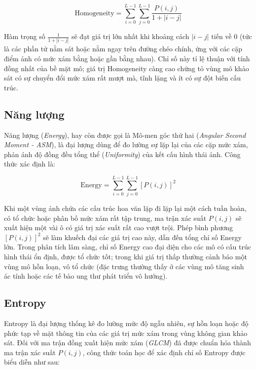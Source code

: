\begin{equation}
\text{Homogeneity} = \sum_{i=0}^{L-1} \sum_{j=0}^{L-1} \frac{P(i, j)}{1 + |i - j|}
\label{eq:homogeneity}
\end{equation}

Hàm trọng số $\frac{1}{1 + |i - j|}$ sẽ đạt giá trị lớn nhất khi khoảng cách $|i - j|$ tiến về $0$ (tức là các phần tử nằm sát hoặc nằm ngay trên đường chéo chính, ứng với các cặp điểm ảnh có mức xám bằng hoặc gần bằng nhau). Chỉ số này tỉ lệ thuận với tính đồng nhất của bề mặt mô; giá trị Homogeneity càng cao chứng tỏ vùng mô khảo sát có sự chuyển đổi mức xám rất mượt mà, tĩnh lặng và ít có sự đột biến cấu trúc.

\subsection{Năng lượng}
Năng lượng (\textit{Energy}), hay còn được gọi là Mô-men góc thứ hai (\textit{Angular Second Moment - ASM}), là đại lượng dùng để đo lường sự lặp lại của các cặp mức xám, phản ánh độ đồng đều tổng thể (\textit{Uniformity}) của kết cấu hình thái ảnh. Công thức xác định là:

\begin{equation}
\text{Energy} = \sum_{i=0}^{L-1} \sum_{j=0}^{L-1} \left[ P(i, j) \right]^2
\label{eq:energy}
\end{equation}

Khi một vùng ảnh chứa các cấu trúc hoa văn lặp đi lặp lại một cách tuần hoàn, có tổ chức hoặc phân bố mức xám rất tập trung, ma trận xác suất $P(i, j)$ sẽ xuất hiện một vài ô có giá trị xác suất rất cao vượt trội. Phép bình phương $\left[ P(i, j) \right]^2$ sẽ làm khuếch đại các giá trị cao này, dẫn đến tổng chỉ số Energy lớn. Trong phân tích lâm sàng, chỉ số Energy cao đại diện cho các mô có cấu trúc hình thái ổn định, được tổ chức tốt; trong khi giá trị thấp thường cảnh báo một vùng mô hỗn loạn, vô tổ chức (đặc trưng thường thấy ở các vùng mô tăng sinh ác tính hoặc các tế bào ung thư phát triển vô hướng).


\subsection{Entropy}

Entropy là đại lượng thống kê đo lường mức độ ngẫu nhiên, sự hỗn loạn hoặc độ phức tạp về mặt thông tin của các giá trị mức xám trong vùng không gian khảo sát. Đối với ma trận đồng xuất hiện mức xám (\textit{GLCM}) đã được chuẩn hóa thành ma trận xác suất $P(i, j)$, công thức toán học để xác định chỉ số Entropy được biểu diễn như sau:

